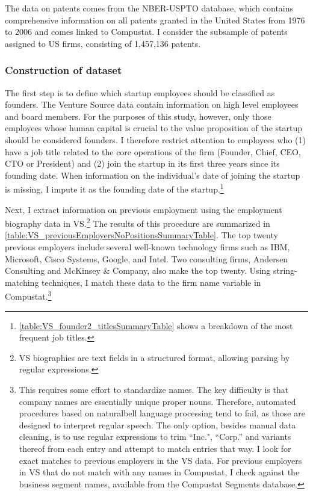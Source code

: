 \documentclass[ecta,nameyear,final]{econsocart}
\theoremstyle{plain}
\theoremstyle{remark}
\begin{document}
The data on patents comes from the NBER-USPTO database, which contains comprehensive information on all patents granted in the United States from 1976 to 2006 and comes linked to Compustat. I consider the subsample of patents assigned to US firms, consisting of 1,457,136 patents. 

\subsubsection{Construction of dataset}

The first step is to define which startup employees should be classified as founders. The Venture Source data contain information on high level employees and board members. For the purposes of this study, however, only those employees whose human capital is crucial to the value proposition of the startup should be considered founders. I  therefore restrict attention to employees who (1) have a job title related to the core operations of the firm (Founder, Chief, CEO, CTO or President) and (2) join the startup in its first three years since its founding date. When information on the individual's date of joining the startup is missing, I impute it as the founding date of the startup.\footnote{\autoref{table:VS_founder2_titlesSummaryTable} shows a breakdown of the most frequent job titles.}

Next, I extract information on previous employment using the employment biography data in VS.\footnote{VS biographies are text fields in a structured format, allowing parsing by regular expressions.} The results of this procedure are summarized in \autoref{table:VS_previousEmployersNoPositionsSummaryTable}. The top twenty previous employers include several well-known technology firms such as IBM, Microsoft, Cisco Systems, Google, and Intel. Two consulting firms, Andersen Consulting and McKinsey \& Company, also make the top twenty. Using string-matching techniques, I match these data to the firm name variable in Compustat.\footnote{This requires some effort to standardize names. The key difficulty is that company names are essentially unique proper nouns. Therefore, automated procedures based on naturalbell language processing tend to fail, as those are designed to interpret regular speech. The only option, besides manual data cleaning, is to use regular expressions to trim ``Inc.", ``Corp.'' and variants thereof from each entry and attempt to match entries that way. I look for exact matches to previous employers in the VS data. For previous employers in VS that do not match with any names in Compustat, I check against the business segment names, available from the Compustat Segments database.}
\end{document}
